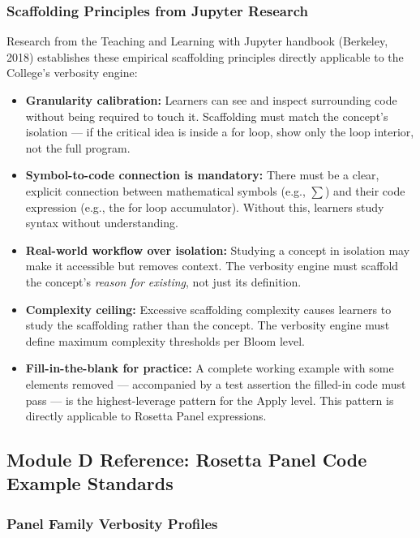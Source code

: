 \documentclass[11pt,letterpaper]{article}
\begin{document}
\subsubsection{Scaffolding Principles from Jupyter Research}

Research from the Teaching and Learning with Jupyter handbook (Berkeley, 2018) establishes these empirical scaffolding principles directly applicable to the College's verbosity engine:

\begin{itemize}
  \item \textbf{Granularity calibration:} Learners can see and inspect surrounding code without being required to touch it. Scaffolding must match the concept's isolation --- if the critical idea is inside a for loop, show only the loop interior, not the full program.
  \item \textbf{Symbol-to-code connection is mandatory:} There must be a clear, explicit connection between mathematical symbols (e.g., $\sum$) and their code expression (e.g., the for loop accumulator). Without this, learners study syntax without understanding.
  \item \textbf{Real-world workflow over isolation:} Studying a concept in isolation may make it accessible but removes context. The verbosity engine must scaffold the concept's \textit{reason for existing}, not just its definition.
  \item \textbf{Complexity ceiling:} Excessive scaffolding complexity causes learners to study the scaffolding rather than the concept. The verbosity engine must define maximum complexity thresholds per Bloom level.
  \item \textbf{Fill-in-the-blank for practice:} A complete working example with some elements removed --- accompanied by a test assertion the filled-in code must pass --- is the highest-leverage pattern for the Apply level. This pattern is directly applicable to Rosetta Panel expressions.
\end{itemize}

\subsection{Module D Reference: Rosetta Panel Code Example Standards}

\subsubsection{Panel Family Verbosity Profiles}
\end{document}
